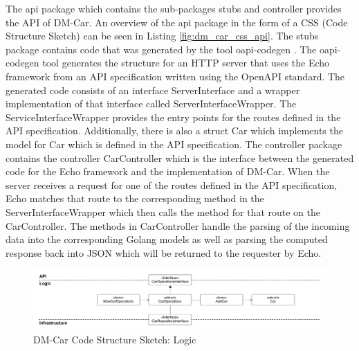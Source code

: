 The api package which contains the sub-packages stubs and controller provides the API of DM-Car.
An overview of the api package in the form of a CSS (Code Structure Sketch) can be seen in Listing \ref{fig:dm_car_css_api}.
The stubs package contains code that was generated by the tool oapi-codegen \cite{DEE-OAPI}.
The oapi-codegen tool generates the structure for an HTTP server that uses the Echo framework \cite{LAB-DOCS}
from an API specification written using the OpenAPI standard.
The generated code consists of an interface ServerInterface and a wrapper implementation of that interface
called ServerInterfaceWrapper. The ServiceInterfaceWrapper provides the entry
points for the routes defined in the API specification. Additionally, there is
also a struct Car which implements the model for Car which is defined in the
API specification. The controller package contains the controller CarController
which is the interface between the generated code for the Echo framework and
the implementation of DM-Car. When the server receives a request for one of the
routes defined in the API specification, Echo matches that route to the
corresponding method in the ServerInterfaceWrapper which then calls the method
for that route on the CarController. The methods in CarController handle the
parsing of the incoming data into the corresponding Golang models as well as
parsing the computed response back into JSON which will be returned to the
requester by Echo.

\begin{figure}[tb]
	\centering
	\includegraphics[width=\textwidth]{figures/dm_car_css_logic.png}
	\caption{DM-Car Code Structure Sketch: Logic}
	\label{fig:dm_car_css_logic}
\end{figure}


